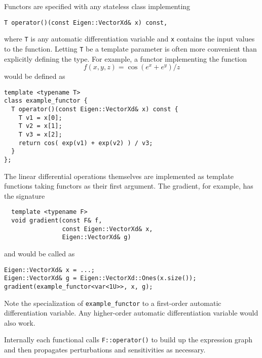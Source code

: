 Functors are specified with any stateless class implementing
%
\begin{verbatim}
T operator()(const Eigen::VectorXd& x) const,
\end{verbatim}
%
where \verb|T| is any automatic differentiation variable and \verb|x|
contains the input values to the function.  Letting \verb|T| be
a template parameter is often more convenient than explicitly
defining the type.  For example, a functor implementing the function
%
\begin{equation*}
f \! \left( x, y, z \right) = \cos \! \left( e^{x} + e^{y} \right) / z
\end{equation*}
%
would be defined as
%
\begin{verbatim}
template <typename T>
class example_functor {
  T operator()(const Eigen::VectorXd& x) const {
    T v1 = x[0];
    T v2 = x[1];
    T v3 = x[2];
    return cos( exp(v1) + exp(v2) ) / v3;  
  }
};
\end{verbatim}

The linear differential operations themselves are implemented as
template functions taking functors as their first argument.  The 
gradient, for example, has the signature
%
\begin{verbatim}
  template <typename F>
  void gradient(const F& f,
                const Eigen::VectorXd& x,
                Eigen::VectorXd& g)
\end{verbatim}
%
and would be called as
%
\begin{verbatim}
Eigen::VectorXd& x = ...;
Eigen::VectorXd& g = Eigen::VectorXd::Ones(x.size());
gradient(example_functor<var<1U>>, x, g);
\end{verbatim}
%
Note the specialization of \verb|example_functor| to a first-order
automatic differentiation variable.  Any higher-order automatic
differentiation variable would also work.

Internally each functional calls \verb|F::operator()| to build up
the expression graph and then propagates perturbations and
sensitivities as necessary.
